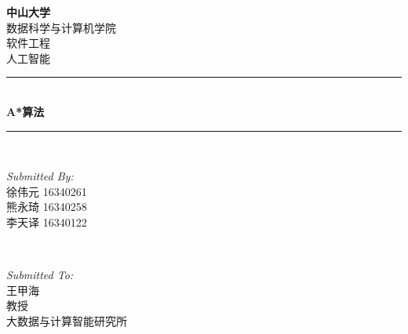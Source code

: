 \begin{titlepage}

\newcommand{\HRule}{\rule{\linewidth}{0.5mm}} %

\center %
 

\textsc{\LARGE \bfseries 中山大学 }\\[0.3cm] %
\textsc{\Large 数据科学与计算机学院}\\[0.5cm] %
\textsc{\Large 软件工程}\\[0.3cm] %
\textsc{\Large 人工智能}\\[0.5cm]


\HRule \\[0.4cm]
{ \huge \bfseries A*算法}\\[0.03cm] %
\HRule \\[1.5cm]

 

\begin{minipage}{0.4\textwidth}
\begin{flushleft} \large
\emph{Submitted By:}\\
徐伟元 16340261\\
熊永琦 16340258\\
李天译 16340122
\end{flushleft}
\end{minipage}
~
\begin{minipage}{0.5\textwidth}
\begin{flushright} \large
\emph{Submitted To:} \\
王甲海\\ 教授\\ 大数据与计算智能研究所 %
\end{flushright}
\end{minipage}\\[1cm]


\end{titlepage}
